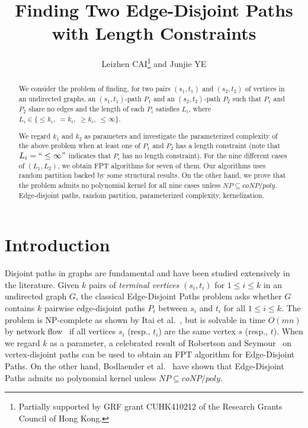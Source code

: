 \documentclass{llncs}
\begin{document}
\title{ 
\Large \bf  Finding Two Edge-Disjoint Paths with Length Constraints
}
\author{
	Leizhen CAI\thanks{Partially supported by GRF grant CUHK410212 of the Research Grants Council of Hong Kong.} and Junjie YE}
\maketitle

\begin{abstract}
	We consider the problem of finding, for two pairs $(s_1,t_1)$
	and $(s_2,t_2)$ of vertices in an undirected graphs, an $(s_1,t_1)$-path $P_1$
	and an $(s_2,t_2)$-path $P_2$ such that $P_1$ and $P_2$ share no edges and
	the length of each $P_i$ satisfies $L_i$, where
	$L_i \in \{ \le k_i, \; = k_i, \; \ge k_i, \; \le \infty\}$.
	
	We regard $k_1$ and $k_2$ as parameters and investigate the parameterized complexity
	of the above problem when at least one of $P_1$ and $P_2$ has a length constraint
	(note that $L_i = ``\le \infty"$ indicates that $P_i$ has no length constraint).
	For the nine different cases of $(L_1, L_2)$, we obtain FPT algorithms for seven of them.
	Our algorithms uses random partition backed by some structural results.
	On the other hand,  we prove that the problem admits no polynomial kernel for
	all nine cases unless $NP \subseteq coNP/poly$. \\

	 Edge-disjoint paths, random partition, parameterized complexity,
	kernelization.
\end{abstract}

\section{Introduction}

Disjoint paths in graphs are fundamental and have been studied extensively in the literature. 
Given $k$ pairs of {\em terminal vertices} $(s_i, t_i)$ for $1 \le i \le k$ in an undirected 
graph $G$, the classical {\sc Edge-Disjoint Paths} problem asks whether $G$ contains $k$ 
pairwise edge-disjoint paths $P_i$ between $s_i$ and $t_i$ for all $1 \le i \le k$. 
The problem is NP-complete as shown by Itai et al.~\cite{itai1982complexity},
but is solvable in time $O(mn)$ by network flow~\cite{orlin2013max} 
if all vertices $s_i$ (resp.,  $t_i$) are the same vertex $s$ (resp.,  $t$). 
When we regard $k$ as a parameter, a celebrated result of Robertson and 
Seymour~\cite{robertson1995graph} on vertex-disjoint paths can be used to
obtain an FPT algorithm for {\sc Edge-Disjoint Paths}.
On the other hand, Bodlaender et al.~\cite{bodlaender2011kernel} have shown that 
{\sc Edge-Disjoint Paths} admits no polynomial kernel unless $NP \subseteq coNP/poly$.  
\end{document}
